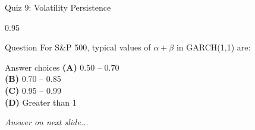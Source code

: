 \documentclass[9pt, aspectratio=169, t]{beamer}
\begin{document}
\begin{frame}{Quiz 9: Volatility Persistence}
    \begin{cminipage}{0.95\textwidth}
    \begin{alertblock}{Question}
        For S\&P 500, typical values of $\alpha + \beta$ in GARCH(1,1) are:
    \end{alertblock}

    \vspace{0.4cm}

    \begin{block}{Answer choices}
        \textcolor{MainBlue}{\textbf{(A)}} 0.50 -- 0.70\\[3pt]
        \textcolor{MainBlue}{\textbf{(B)}} 0.70 -- 0.85\\[3pt]
        \textcolor{MainBlue}{\textbf{(C)}} 0.95 -- 0.99\\[3pt]
        \textcolor{MainBlue}{\textbf{(D)}} Greater than 1
    \end{block}

    \vspace{0.5cm}

    \begin{center}
        \textit{Answer on next slide...}
    \end{center}
    \end{cminipage}
\end{frame}
\end{document}
